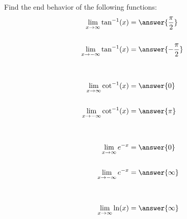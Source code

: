 \documentclass{ximera}
\author{Bobby Ramsey}
\begin{document}
\begin{exercise}


Find the end behavior of the following functions:
\begin{align*}
	\lim_{x\to \infty} \tan^{-1}(x) &= \answer{\frac{\pi}{2}}\\ \\
	\lim_{x\to -\infty} \tan^{-1}(x) &= \answer{-\frac{\pi}{2}}\\ \\ \\
	\lim_{x\to \infty} \cot^{-1}(x) &= \answer{0}\\ \\
	\lim_{x\to -\infty} \cot^{-1}(x) &= \answer{\pi}\\ \\ \\
	\lim_{x\to \infty} e^{-x} &= \answer{0}\\ \\
	\lim_{x\to -\infty} e^{-x} &= \answer{\infty}\\ \\ \\
	\lim_{x\to \infty} \ln(x) &= \answer{\infty}
\end{align*}


\end{exercise}
\end{document}
